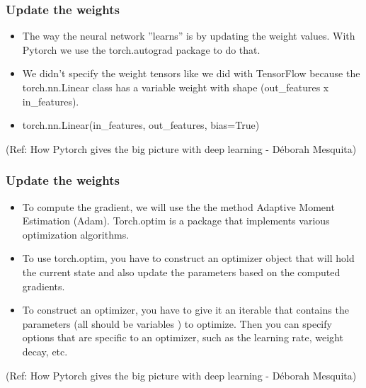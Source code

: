 \begin{frame}[fragile] \frametitle{Update the weights}
\begin{itemize}
\item The way the neural network ''learns'' is by updating the weight values. With Pytorch we use the torch.autograd package to do that.
\item We didn’t specify the weight tensors like we did with TensorFlow because the torch.nn.Linear class has a variable weight with shape (out\_features x in\_features).
\item torch.nn.Linear(in\_features, out\_features, bias=True)
\end{itemize}

  {\tiny (Ref: How Pytorch gives the big picture with deep learning - Déborah Mesquita)}
\end{frame}

\begin{frame}[fragile] \frametitle{Update the weights}
\begin{itemize}
\item To compute the gradient, we will use the the method Adaptive Moment Estimation (Adam). Torch.optim is a package that implements various optimization algorithms.
\item To use torch.optim, you have to construct an optimizer object that will hold the current state and also update the parameters based on the computed gradients.
\item To construct an optimizer, you have to give it an iterable that contains the parameters (all should be variables ) to optimize. Then you can specify options that are specific to an optimizer, such as the learning rate, weight decay, etc.
\end{itemize}


  {\tiny (Ref: How Pytorch gives the big picture with deep learning - Déborah Mesquita)}
\end{frame}

